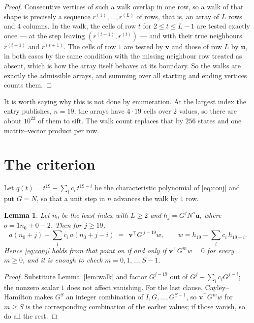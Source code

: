 \documentclass[11pt,a4paper]{article}
\theoremstyle{plain}
\newtheorem{lemma}[theorem]{Lemma}
\theoremstyle{definition}
\begin{document}
\begin{proof}
Consecutive vertices of such a walk overlap in one row, so a walk of that shape is
precisely a sequence $r^{(1)},\dots,r^{(L)}$ of rows, that is, an array of $L$ rows
and $4$ columns. In the walk, the cells of row $t$ for $2\le t\le L-1$ are tested
exactly once --- at the step leaving $(r^{(t-1)},r^{(t)})$ --- and with their true
neighbours $r^{(t-1)}$ and $r^{(t+1)}$. The cells of row $1$ are tested by
$\mathbf{v}$ and those of row $L$ by $\mathbf{u}$, in both cases by the same condition
with the missing neighbour row treated as absent, which is how the array itself behaves at
its boundary. So the walks are exactly the admissible arrays, and summing over all starting
and ending vertices counts them.
\end{proof}


It is worth saying why this is not done by enumeration. At the largest index the entry
publishes, $n=19$, the arrays have $4\cdot19$ cells over
$2$ values, so there are about $10^{22}$ of them to sift. The
walk count replaces that by $256$ states and one matrix--vector product per row.
\section{The criterion}

Let $q(t)=t^{19}-\sum_i c_i\,t^{19-i}$ be the characteristic polynomial of
\eqref{eq:conj} and put $G=N$, so that a unit step in $n$ advances the walk by
$1$ row.

\begin{lemma}\label{lem:crit}
Let $n_0$ be the least index with $L\ge2$ and $h_j=G^{j}N^{o}\mathbf{u}$, where
$o=1n_0+0-2$. Then for $j\ge19$,
\[
a(n_0+j)-\sum_i c_i\,a(n_0+j-i)\;=\;\,\mathbf{v}^{\!\top}G^{\,j-19}w,
\qquad w=h_{19}-\sum_i c_i\,h_{19-i} .
\]
Hence \eqref{eq:conj} holds from that point on if and only if
$\mathbf{v}^{\!\top}G^{m}w=0$ for every $m\ge0$, and it is enough to check
$m=0,1,\dots,S-1$.
\end{lemma}

\begin{proof}
Substitute Lemma~\ref{lem:walk} and factor $G^{j-19}$ out of
$G^{j}-\sum_ic_iG^{j-i}$; the nonzero scalar $1$ does not affect
vanishing. For the last clause, Cayley--Hamilton makes $G^{S}$ an integer combination of
$I,G,\dots,G^{S-1}$, so $\mathbf{v}^{\!\top}G^{m}w$ for $m\ge S$ is the corresponding
combination of the earlier values; if those vanish, so do all the rest.
\end{proof}
\end{document}
